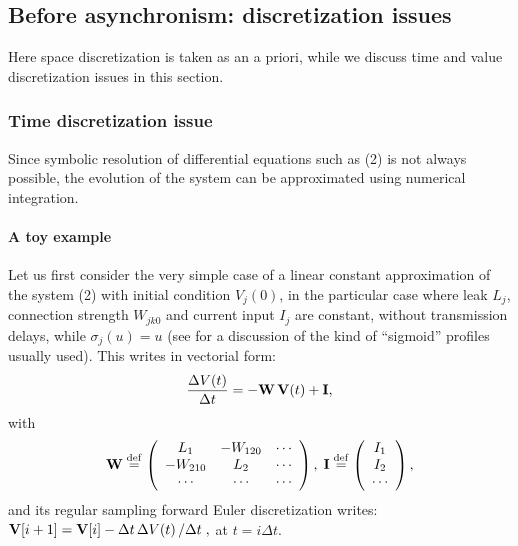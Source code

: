 \subsection{Before asynchronism: discretization issues}

Here space discretization is taken as an a priori, while we discuss time and value discretization issues in this section.

\subsubsection{Time discretization issue}

Since symbolic resolution of differential equations such as (2) is not always possible, the evolution of the system can be approximated using numerical integration.

\paragraph*{A toy example}

\newcommand{\deq}{\stackrel {\rm def}{=}}

 Let us first consider the very simple case of a linear constant approximation of the system (2) with initial condition $V_j(0)$, in the particular case where leak $L_j$, connection strength $W_{jk0}$ and current input $I_j$ are constant, without transmission delays,
while $\sigma_j\left(u\right) = u$ (see \cite{Alexandre:2009} for a discussion of the kind of ``sigmoid'' profiles usually used). This writes in vectorial form:
$$\frac{\Delta V(t)}{\Delta t} = -{\bf W} \, {\bf V}(t) + {\bf I},$$
with
\begin{align}
\label{eq:def-W}
{\bf W} \deq \left(\begin{array}{ccc} L_1 & -W_{120} & \cdots \\ -W_{210} & L_2 & \cdots \\  \cdots & \cdots & \cdots \\ \end{array} \right), \;
{\bf I} \deq \left(\begin{array}{c} I_1 \\ I_2 \\ \cdots \\ \end{array} \right),
\end{align}
and its regular sampling forward Euler discretization writes: $ {\bf V}[i+1] = {\bf V}[i] - \Delta t \, {\Delta V(t)}\left/{\Delta t}\right.,$ at $t = i \Delta t$. 

